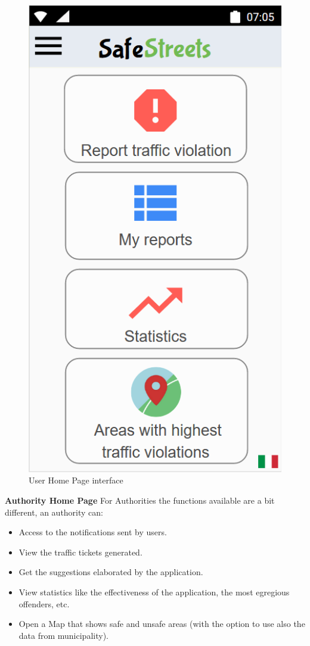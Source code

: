     \begin{figure}[h]
    \centering
    \includegraphics[scale=0.8]{Images/user_menu.png}
    \caption{User Home Page interface}
    \end{figure}\newpage
    \noindent\textbf{Authority Home Page}\newline
    For Authorities the functions available are a bit different, an authority can:
    \begin{itemize}
        \item Access to the notifications sent by users.
        \item View the traffic tickets generated.
        \item Get the suggestions elaborated by the application.
        \item View statistics like the effectiveness of the application, the most egregious offenders, etc.
        \item Open a Map that shows safe and unsafe areas (with the option to use also the data from municipality).
    \end{itemize}
